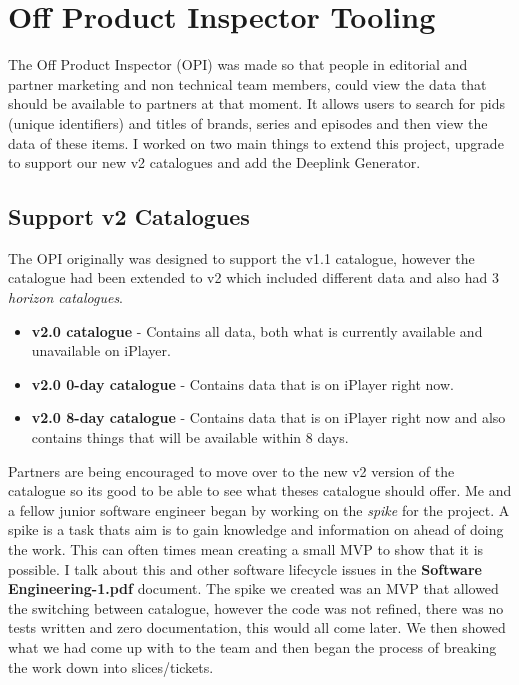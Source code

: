 \section{Off Product Inspector Tooling}

  The Off Product Inspector (OPI) was made so that people in editorial and partner marketing and non technical team members, could view the data that
  should be available to partners at that moment. It allows users to search for pids (unique identifiers) and titles of brands, series and episodes
  and then view the data of these items. I worked on two main things to extend this project, upgrade to support our new v2 catalogues and add the 
  Deeplink Generator.

  \subsection{Support v2 Catalogues}
  The OPI originally was designed to support the v1.1 catalogue, however the catalogue had been extended to v2 which included different data and also 
  had 3 \textit{horizon catalogues}.
  \begin{itemize}
    \item \textbf{v2.0 catalogue} - Contains all data, both what is currently available and unavailable on iPlayer.
    \item \textbf{v2.0 0-day catalogue} - Contains data that is on iPlayer right now.
    \item \textbf{v2.0 8-day catalogue} - Contains data that is on iPlayer right now and also contains things that will be available within 8 days.
  \end{itemize}

  Partners are being encouraged to move over to the new v2 version of the catalogue so its good to be able to see what theses catalogue should offer.
  Me and a fellow junior software engineer began by working on the \textit{spike} for the project. A spike is a task thats aim is to gain knowledge
  and information on ahead of doing the work. This can often times mean creating a small MVP to show that it is possible. I talk about this and other
  software lifecycle issues in the \textbf{Software Engineering-1.pdf} document. The spike we created was an MVP that allowed the switching between 
  catalogue, however the code was not refined, there was no tests written and zero documentation, this would all come later. We then showed what we 
  had come up with to the team and then began the process of breaking the work down into slices/tickets.

